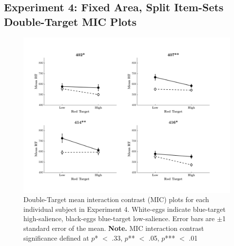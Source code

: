 \subsection{Experiment 4: Fixed Area, Split Item-Sets Double-Target MIC Plots}
\begin{figure}[htb]
\begin{center}
\includegraphics[width=\linewidth]{Figures/Appendix/FIG30PNG.png}
\caption{Double-Target mean interaction contrast (MIC) plots for each individual subject in Experiment 4. White-eggs indicate blue-target high-salience, black-eggs blue-target low-salience. Error bars are $\pm$1 standard error of the mean. \newline
\textbf{Note.} MIC interaction contrast significance defined at $p$* $<$ .33, $p$** $<$ .05, $p$*** $<$ .01}
\label{fig:Indiv_MIC_AB_Ex4}
\end{center}
\end{figure}
\newpage

